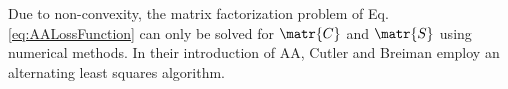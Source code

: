 Due to non-convexity, the matrix factorization problem of Eq. \eqref{eq:AALossFunction} can only be solved for $\matr{C}$ and $\matr{S}$ using numerical methods. In their introduction of AA, Cutler and Breiman \cite{cutler1994a} employ an alternating least squares algorithm. 